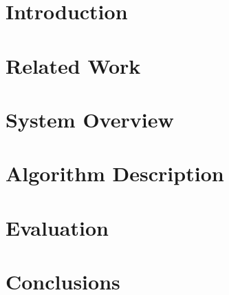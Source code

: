 \documentclass[11pt]{article}
\theoremstyle{plain}
\begin{document}
\section{Introduction}
\label{sec:intro}

\section{Related Work}
\label{sec:related}


\section{System Overview}
\label{sec:system}


\section{Algorithm Description}
\label{sec:algo}


\section{Evaluation}
\label{sec:evaluation}


\section{Conclusions}
\label{sec:conclusions}



\end{document}
